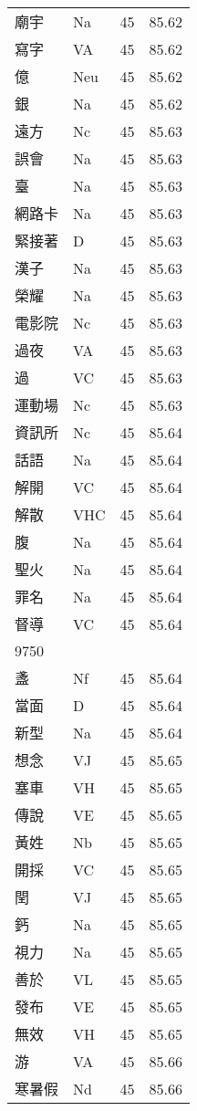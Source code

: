 \documentclass[twocolumn]{book}
\begin{document}
\begin{supertabular}{llrr}
廟宇 & Na & 45 &  85.62\\
寫字 & VA & 45 &  85.62\\
億 & Neu & 45 &  85.62\\
銀 & Na & 45 &  85.62\\
遠方 & Nc & 45 &  85.63\\
誤會 & Na & 45 &  85.63\\
臺 & Na & 45 &  85.63\\
網路卡 & Na & 45 &  85.63\\
緊接著 & D & 45 &  85.63\\
漢子 & Na & 45 &  85.63\\
榮耀 & Na & 45 &  85.63\\
電影院 & Nc & 45 &  85.63\\
過夜 & VA & 45 &  85.63\\
過 & VC & 45 &  85.63\\
運動場 & Nc & 45 &  85.63\\
資訊所 & Nc & 45 &  85.64\\
話語 & Na & 45 &  85.64\\
解開 & VC & 45 &  85.64\\
解散 & VHC & 45 &  85.64\\
腹 & Na & 45 &  85.64\\
聖火 & Na & 45 &  85.64\\
罪名 & Na & 45 &  85.64\\
督導 & VC & 45 &  85.64\\
9750\\
盞 & Nf & 45 &  85.64\\
當面 & D & 45 &  85.64\\
新型 & Na & 45 &  85.64\\
想念 & VJ & 45 &  85.65\\
塞車 & VH & 45 &  85.65\\
傳說 & VE & 45 &  85.65\\
黃姓 & Nb & 45 &  85.65\\
開採 & VC & 45 &  85.65\\
閏 & VJ & 45 &  85.65\\
鈣 & Na & 45 &  85.65\\
視力 & Na & 45 &  85.65\\
善於 & VL & 45 &  85.65\\
發布 & VE & 45 &  85.65\\
無效 & VH & 45 &  85.65\\
游 & VA & 45 &  85.66\\
寒暑假 & Nd & 45 &  85.66\\

\end{supertabular}
\end{document}

